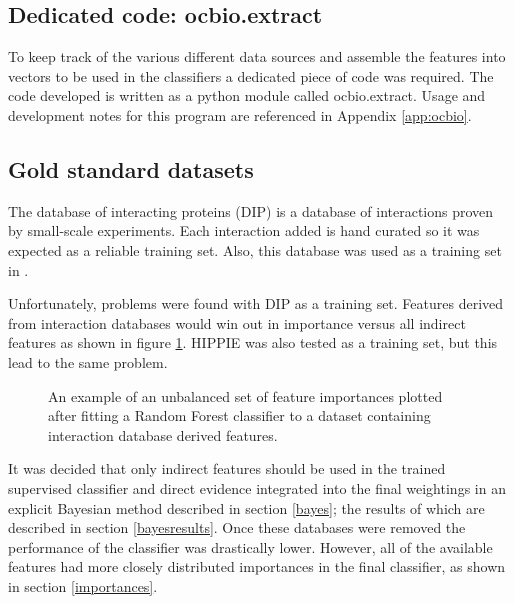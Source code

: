 \subsection{Dedicated code: ocbio.extract}

To keep track of the various different data sources and assemble the features into vectors to be used in the classifiers a dedicated piece of code was required.
The code developed is written as a python module called ocbio.extract.
Usage and development notes for this program are referenced in Appendix \ref{app:ocbio}.

\subsection{Gold standard datasets}


The database of interacting proteins (DIP) is a database of interactions proven by small-scale experiments\autocite{xenarios_dip_2002}.
Each interaction added is hand curated so it was expected as a reliable training set.
Also, this database was used as a training set in \textcite{qi_evaluation_2006}.

Unfortunately, problems were found with DIP as a training set.
Features derived from interaction databases would win out in importance versus all indirect features as shown in figure \ref{fig:unbalanced}.
HIPPIE was also tested as a training set, but this lead to the same problem.

\begin{figure}
    \centering
    \setlength\figureheight{3in}
    \setlength\figurewidth{4in}
    \caption{An example of an unbalanced set of feature importances plotted after fitting a Random Forest classifier to a dataset containing interaction database derived features.}
    \label{fig:unbalanced}
\end{figure}

It was decided that only indirect features should be used in the trained supervised classifier and direct evidence integrated into the final weightings in an explicit Bayesian method described in section \ref{bayes}; the results of which are described in section \ref{bayesresults}.
Once these databases were removed the performance of the classifier was drastically lower.
However, all of the available features had more closely distributed importances in the final classifier, as shown in section \ref{importances}.

